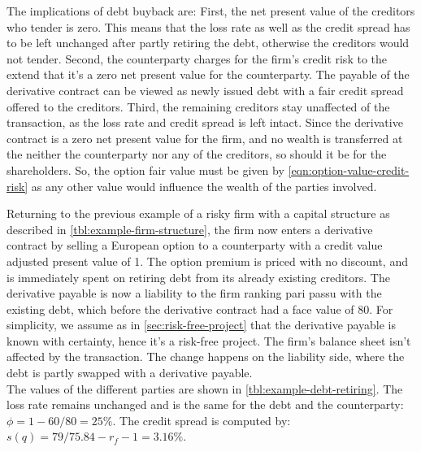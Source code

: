 \documentclass[../main.tex]{subfiles}
\begin{document}
            The implications of debt buyback are: 
            First, the net present value of the creditors who tender is zero. 
            This means that the loss rate as well as the credit spread has to be left unchanged
            after partly retiring the debt, otherwise the creditors would not tender. 
            Second, the counterparty charges for the firm's credit risk 
            to the extend that it's a zero net present value for the counterparty. 
            The payable of the derivative contract can be viewed as newly issued debt
             with a fair credit spread offered to the creditors.
            Third, the remaining creditors stay unaffected of the transaction, 
            as the loss rate and credit spread is left intact. 
            Since the derivative contract is a zero net present value for the firm, 
            and no wealth is transferred at the neither the counterparty nor any of the creditors, 
            so should it be for the shareholders. 
            So, the option fair value must be given by \cref{eqn:option-value-credit-risk} 
            as any other value would influence the wealth of the parties involved.

            Returning to the previous example of a risky firm with a capital structure
            as described in \cref{tbl:example-firm-structure}, 
            the firm now enters a derivative contract by selling a European option to a counterparty
            with a credit value adjusted present value of 1. 
            The option premium is priced with no discount, 
            and is immediately spent on retiring debt from its already existing creditors. 
            The derivative payable is now a liability to the firm ranking pari passu with the existing debt, 
            which before the derivative contract had a face value of 80. 
            For simplicity, we assume as in \cref{sec:risk-free-project}
            that the derivative payable is known with certainty, hence it's a risk-free project. 
            The firm's balance sheet isn't affected by the transaction. 
            The change happens on the liability side, where the debt is partly swapped with a derivative payable.\\
            The values of the different parties are shown in \cref{tbl:example-debt-retiring}. 
            The loss rate remains unchanged and is the same for the debt and the counterparty: $\phi=1-60/80=25\%$. 
            The credit spread is computed by: $s(q)=79/75.84-r_{f}-1=3.16\%$.
            
\end{document}
